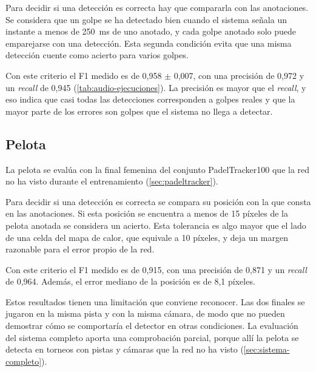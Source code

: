 Para decidir si una detección es correcta hay que compararla con las anotaciones.
Se considera que un golpe se ha detectado bien cuando el sistema señala un instante a menos de 250~ms de uno anotado, y cada golpe anotado solo puede emparejarse con una detección.
Esta segunda condición evita que una misma detección cuente como acierto para varios golpes.

Con este criterio el F1 medido es de 0,958 $\pm$ 0,007, con una precisión de 0,972 y un \textit{recall} de 0,945 (\cref{tab:audio-ejecuciones}).
La precisión es mayor que el \textit{recall}, y eso indica que casi todas las detecciones corresponden a golpes reales y que la mayor parte de los errores son golpes que el sistema no llega a detectar.

\begin{table}[htbp]
  \centering
  \caption{Resultado del detector de golpes por sonido: media de las tres ejecuciones y desviación típica del F1.}
  \label{tab:audio-ejecuciones}
  \small
  
\end{table}

\subsection{Pelota}
\label{sec:resultados-pelota}

La pelota se evalúa con la final femenina del conjunto PadelTracker100 que la red no ha visto durante el entrenamiento (\cref{sec:padeltracker}).

Para decidir si una detección es correcta se compara su posición con la que consta en las
anotaciones.
Si esta posición se encuentra a menos de 15 píxeles de la pelota anotada se considera un acierto.
Esta tolerancia es algo mayor que el lado de una celda del mapa de calor, que equivale a 10 píxeles, y deja un margen razonable para el error propio de la red.

Con este criterio el F1 medido es de 0,915, con una precisión de 0,871 y un \textit{recall} de 0,964.
Además, el error mediano de la posición es de 8,1 píxeles.

Estos resultados tienen una limitación que conviene reconocer.
Las dos finales se jugaron en la misma pista y con la misma cámara, de modo que no pueden demostrar cómo se comportaría el detector en otras condiciones.
La evaluación del sistema completo aporta una comprobación parcial, porque allí la pelota se detecta en torneos con pistas y cámaras que la red no ha visto (\cref{sec:sistema-completo}).

